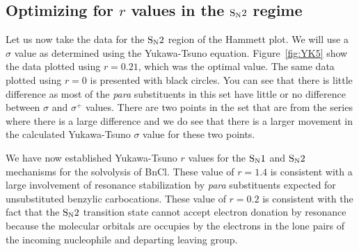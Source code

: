 \documentclass{tufte-handout}
\begin{document}
\subsection{Optimizing for $r$ values in the $\rm S_N2$ regime}

Let us now take the data for the $\rm S_N2$ region of the Hammett plot. We will use a $\sigma$ value as determined using the Yukawa-Tsuno equation. Figure~\vref{fig:YK5} show the data plotted using $r = 0.21$, which was the optimal value. The same data plotted using $r = 0$ is presented with black circles. You can see that there is little difference as most of the \textit{para} substituents in this set have little or no difference between $\sigma$ and $\sigma^+$ values. There are two points in the set that are from the  series where there is a large difference and we do see that there is a larger movement in the calculated Yukawa-Tsuno $\sigma$ value for these two points.

We have now established Yukawa-Tsuno $r$ values for the $\rm S_N1$ and $\rm S_N2$ mechanisms for the solvolysis of BnCl. These value of $r = 1.4$ is consistent with a large involvement of resonance stabilization by \textit{para} substituents expected for unsubstituted benzylic carbocations.  These value of $r = 0.2$ is consistent with the fact that the $\rm S_N2$ transition state cannot accept electron donation by resonance because the molecular orbitals are occupies by the electrons in the lone pairs of the incoming nucleophile and departing leaving group.
\end{document}
